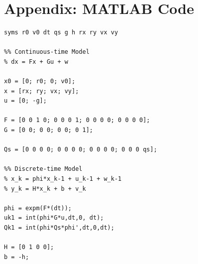 \documentclass{article}
\begin{document}
\section{Appendix: MATLAB Code}

\begin{lstlisting}[style=Matlab-editor]
%% Symbolic Variables
syms r0 v0 dt qs g h rx ry vx vy

%% Continuous-time Model
% dx = Fx + Gu + w

x0 = [0; r0; 0; v0];
x = [rx; ry; vx; vy];
u = [0; -g];

F = [0 0 1 0; 0 0 0 1; 0 0 0 0; 0 0 0 0];
G = [0 0; 0 0; 0 0; 0 1];

Qs = [0 0 0 0; 0 0 0 0; 0 0 0 0; 0 0 0 qs];

%% Discrete-time Model
% x_k = phi*x_k-1 + u_k-1 + w_k-1
% y_k = H*x_k + b + v_k

phi = expm(F*(dt));
uk1 = int(phi*G*u,dt,0, dt);
Qk1 = int(phi*Qs*phi',dt,0,dt);

H = [0 1 0 0];
b = -h;
\end{lstlisting}
\end{document}

